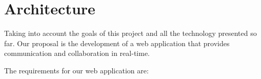 \chapter{Architecture}
\label{chapter:architecture}




Taking into account the goals of this project and all the technology presented so far. Our proposal is the development of a web application that provides communication and collaboration in real-time.

The requirements for our web application are:

